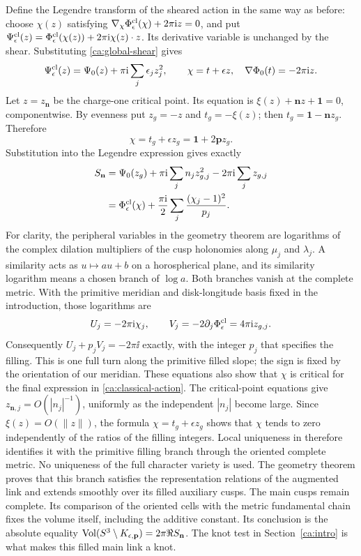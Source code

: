 Define the Legendre transform of the sheared action in the same way
as before: choose $\chi(z)$ satisfying
$\nabla_\chi\Phi_\epsilon^{\rm cl}(\chi)+2\pi\mathrm i z=0$, and put
$\Psi_\epsilon^{\rm cl}(z)=\Phi_\epsilon^{\rm cl}(\chi(z))+
2\pi\mathrm i\chi(z)\cdot z$. Its derivative variable is unchanged by
the shear. Substituting \eqref{ca:global-shear} gives
\begin{equation}\label{ca:Legendre-shear}
 \Psi_\epsilon^{\rm cl}(z)=\Psi_0(z)+\pi\mathrm i\sum_j\epsilon_jz_j^2,
 \qquad \chi=t+\epsilon z,
 \quad \nabla\Phi_0(t)=-2\pi\mathrm i z.
\end{equation}
Let $z=z_{\mathbf n}$ be the charge-one critical point. Its equation is
$\xi(z)+\mathbf n z+\mathbf1=0$, componentwise. By evenness put
$z_g=-z$ and $t_g=-\xi(z)$; then
$t_g=\mathbf1-\mathbf n z_g$. Therefore
\[
 \chi=t_g+\epsilon z_g=\mathbf1+2\mathbf p z_g.
\]
Substitution into the Legendre expression gives exactly
\begin{align}
 S_{\mathbf n}
 &=\Psi_0(z_g)+\pi\mathrm i\sum_jn_j z_{g,j}^2
                        -2\pi\mathrm i\sum_j z_{g,j}\notag\\
 &=\Phi_\epsilon^{\rm cl}(\chi)
       +\frac{\pi\mathrm i}{2}\sum_j\frac{(\chi_j-1)^2}{p_j}.
 \label{ca:classical-action}
\end{align}
For clarity, the peripheral variables in the geometry theorem are
logarithms of the complex dilation multipliers of the cusp
holonomies along $\mu_j$ and $\lambda_j$. A similarity acts as
$u\mapsto a u+b$ on a horospherical plane, and its similarity
logarithm means a chosen branch of $\log a$. Both branches vanish
at the complete metric. With the primitive meridian and disk-longitude
basis fixed in the introduction, those logarithms are
\[
 U_j=-2\pi\mathrm i\chi_j,\qquad
 V_j=-2\partial_j\Phi_\epsilon^{\rm cl}
       =4\pi\mathrm i z_{g,j}.
\]
Consequently $U_j+p_jV_j=-2\pi\ii$ exactly, with the integer
$p_j$ that specifies the filling. This is one full turn along the
primitive filled slope; the sign is fixed by the orientation of our
meridian. These equations also show that $\chi$ is critical
for the final expression in \eqref{ca:classical-action}.
The critical-point equations give
$z_{\mathbf n,j}=O(|n_j|^{-1})$, uniformly as the independent
$|n_j|$ become large. Since $\xi(z)=O(\|z\|)$, the formula $\chi=t_g+\epsilon z_g$
shows that $\chi$ tends to zero independently of the ratios
of the filling integers. Local uniqueness in
\cite[Theorem 1.3]{StrictGeometry} therefore identifies it with
the primitive filling branch through the oriented complete metric.
No uniqueness of the full character variety is used.
The geometry theorem proves that this branch satisfies the
representation relations of the augmented link and extends smoothly
over its filled auxiliary cusps. The main cusps remain complete.
Its comparison of the oriented cells with the metric fundamental
chain fixes the volume itself, including the additive constant. Its conclusion is the absolute equality
$\operatorname{Vol}(S^3\setminus K_{\epsilon,\mathbf p})
=2\pi\Re S_{\mathbf n}$.
The knot test in Section~\ref{ca:intro} is what makes this
filled main link a knot.

